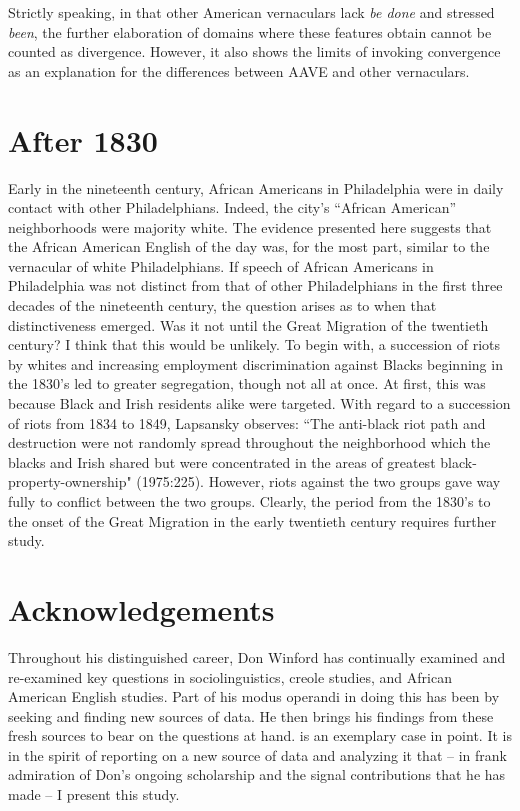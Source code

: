 \documentclass[output=paper,colorlinks,citecolor=brown]{langscibook}
\begin{document}
Strictly speaking, in that other American vernaculars lack \textit{be done} and stressed \textit{been}, the further elaboration of domains where these features obtain cannot be counted as divergence. However, it also shows the limits of invoking convergence as an explanation for the differences between AAVE and other vernaculars.

\section{After 1830} \label{section6}

Early in the nineteenth century, African Americans in Philadelphia were in daily contact with other Philadelphians. Indeed, the city’s “African American” neighborhoods were majority white. The evidence presented here suggests that the African American English of the day was, for the most part, similar to the vernacular of white Philadelphians. If speech of African Americans in Philadelphia was not distinct from that of other Philadelphians in the first three decades of the nineteenth century, the question arises as to when that distinctiveness emerged. Was it not until the Great Migration of the twentieth century? I think that this would be unlikely. To begin with, a succession of riots by whites and increasing employment discrimination against Blacks beginning in the 1830’s led to greater segregation, though not all at once. At first, this was because Black and Irish residents alike were targeted. With regard to a succession of riots from 1834 to 1849, Lapsansky observes: “The anti-black riot path and destruction were not randomly spread throughout the neighborhood which the blacks and Irish shared but were concentrated in the areas of greatest black- property-ownership" (1975:225). However, riots against the two groups gave way fully to conflict between the two groups. Clearly, the period from the 1830’s to the onset of the Great Migration in the early twentieth century requires further study.



\section*{Acknowledgements}

Throughout his distinguished career, Don Winford has continually examined and re-examined key questions in sociolinguistics, creole studies, and African American English studies. Part of his modus operandi in doing this has been by seeking and finding new sources of data. He then brings his findings from these fresh sources to bear on the questions at hand. \citet{winford2017} is an exemplary case in point. It is in the spirit of reporting on a new source of data and analyzing it that -- in frank admiration of Don’s ongoing scholarship and the signal contributions that he has made -- I present this study. 
\end{document}
